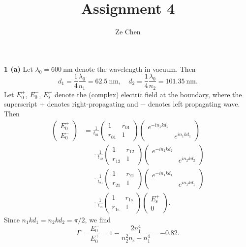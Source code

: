 \documentclass{article}
\title{Assignment 4}
\author{Ze Chen}
\makeatletter
\newcommand*{\shifttext}[1]{%
  \settowidth{\@tempdima}{#1}%
  \hspace{-\@tempdima}#1%
}
\newcommand{\plabel}[1]{%
\shifttext{\textbf{#1}\quad}%
}
\makeatother
\begin{document}
\maketitle

\plabel{1 (a)}%
Let $\lambda_0 = \SI{600}{\nano\meter}$ denote the wavelength in vacuum.
Then
\[ d_1 = \frac{1}{4} \frac{\lambda_0}{n_1} = \SI{62.5}{\nano\meter}, \quad d_2 = \frac{1}{4} \frac{\lambda_0}{n_2} = \SI{101.35}{\nano\meter}. \]
Let $E_0^+$, $E_0^-$, $E_s^+$ denote the (complex) electric field at the boundary, where the superscript $+$ denotes right-propagating and $-$ denotes left propagating wave.
Then
\begin{align*}
    \begin{pmatrix}
        E_0^+ \\ E_0^-
    \end{pmatrix} &= \frac{1}{t_{01}} \begin{pmatrix}
        1 & r_{01} \\
        r_{01} & 1
    \end{pmatrix} \begin{pmatrix}
        e^{-in_1kd_1} & \\
        & e^{in_1kd_1}
    \end{pmatrix} \\
    &\phantom{{}={}} \cdot \frac{1}{t_{12}} \begin{pmatrix}
        1 & r_{12} \\
        r_{12} & 1
    \end{pmatrix} \begin{pmatrix}
        e^{-in_2kd_2} & \\
        & e^{in_2kd_2}
    \end{pmatrix} \\
    &\phantom{{}={}} \cdot \frac{1}{t_{21}} \begin{pmatrix}
        1 & r_{21} \\
        r_{21} & 1
    \end{pmatrix} \begin{pmatrix}
        e^{-in_1kd_1} & \\
        & e^{in_1kd_1}
    \end{pmatrix} \\
    &\phantom{{}={}} \cdot \frac{1}{t_{1\mathrm{s}}} \begin{pmatrix}
        1 & r_{1\mathrm{s}} \\
        r_{1\mathrm{s}} & 1
    \end{pmatrix} \begin{pmatrix}
        E_{\mathrm{s}}^+ \\
        0
    \end{pmatrix}.
\end{align*}
Since $n_1 k d_1 = n_2 k d_2 = \pi / 2$, we find
\[ \Gamma = \frac{E_0^-}{E_0^+} = 1 - \frac{2n_1^4}{n_2^2 n_{\mathrm{s}} + n_1^4} = -0.82. \]
\end{document}
